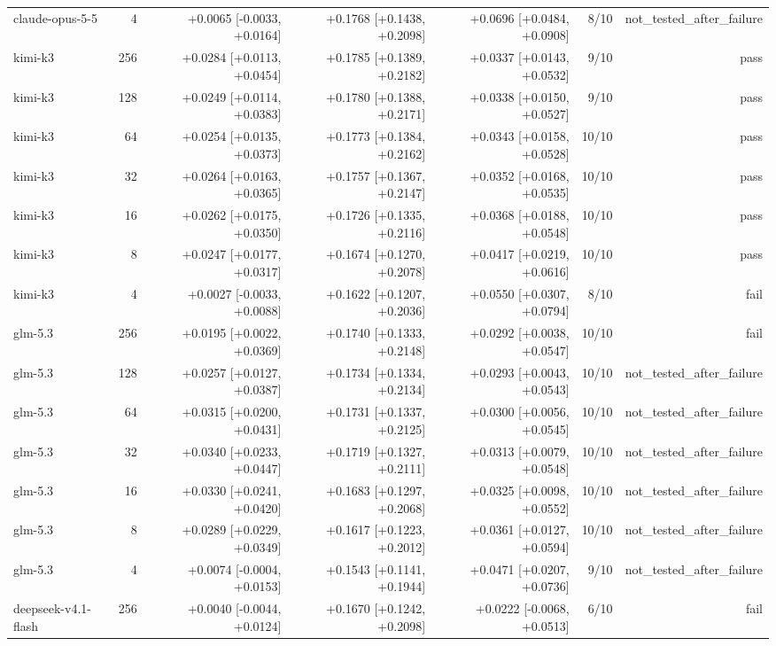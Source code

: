 \begin{longtable}{lrrrrrr}
claude-opus-5-5 & 4 & +0.0065 [-0.0033, +0.0164] & +0.1768 [+0.1438, +0.2098] & +0.0696 [+0.0484, +0.0908] & 8/10 & not\_tested\_after\_failure \\
kimi-k3 & 256 & +0.0284 [+0.0113, +0.0454] & +0.1785 [+0.1389, +0.2182] & +0.0337 [+0.0143, +0.0532] & 9/10 & pass \\
kimi-k3 & 128 & +0.0249 [+0.0114, +0.0383] & +0.1780 [+0.1388, +0.2171] & +0.0338 [+0.0150, +0.0527] & 9/10 & pass \\
kimi-k3 & 64 & +0.0254 [+0.0135, +0.0373] & +0.1773 [+0.1384, +0.2162] & +0.0343 [+0.0158, +0.0528] & 10/10 & pass \\
kimi-k3 & 32 & +0.0264 [+0.0163, +0.0365] & +0.1757 [+0.1367, +0.2147] & +0.0352 [+0.0168, +0.0535] & 10/10 & pass \\
kimi-k3 & 16 & +0.0262 [+0.0175, +0.0350] & +0.1726 [+0.1335, +0.2116] & +0.0368 [+0.0188, +0.0548] & 10/10 & pass \\
kimi-k3 & 8 & +0.0247 [+0.0177, +0.0317] & +0.1674 [+0.1270, +0.2078] & +0.0417 [+0.0219, +0.0616] & 10/10 & pass \\
kimi-k3 & 4 & +0.0027 [-0.0033, +0.0088] & +0.1622 [+0.1207, +0.2036] & +0.0550 [+0.0307, +0.0794] & 8/10 & fail \\
glm-5.3 & 256 & +0.0195 [+0.0022, +0.0369] & +0.1740 [+0.1333, +0.2148] & +0.0292 [+0.0038, +0.0547] & 10/10 & fail \\
glm-5.3 & 128 & +0.0257 [+0.0127, +0.0387] & +0.1734 [+0.1334, +0.2134] & +0.0293 [+0.0043, +0.0543] & 10/10 & not\_tested\_after\_failure \\
glm-5.3 & 64 & +0.0315 [+0.0200, +0.0431] & +0.1731 [+0.1337, +0.2125] & +0.0300 [+0.0056, +0.0545] & 10/10 & not\_tested\_after\_failure \\
glm-5.3 & 32 & +0.0340 [+0.0233, +0.0447] & +0.1719 [+0.1327, +0.2111] & +0.0313 [+0.0079, +0.0548] & 10/10 & not\_tested\_after\_failure \\
glm-5.3 & 16 & +0.0330 [+0.0241, +0.0420] & +0.1683 [+0.1297, +0.2068] & +0.0325 [+0.0098, +0.0552] & 10/10 & not\_tested\_after\_failure \\
glm-5.3 & 8 & +0.0289 [+0.0229, +0.0349] & +0.1617 [+0.1223, +0.2012] & +0.0361 [+0.0127, +0.0594] & 10/10 & not\_tested\_after\_failure \\
glm-5.3 & 4 & +0.0074 [-0.0004, +0.0153] & +0.1543 [+0.1141, +0.1944] & +0.0471 [+0.0207, +0.0736] & 9/10 & not\_tested\_after\_failure \\
deepseek-v4.1-flash & 256 & +0.0040 [-0.0044, +0.0124] & +0.1670 [+0.1242, +0.2098] & +0.0222 [-0.0068, +0.0513] & 6/10 & fail \\

\end{longtable}
